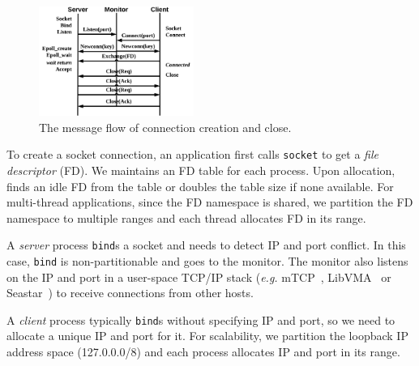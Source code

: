 \begin{figure}[t]
	\centering
	\includegraphics[width=0.45\textwidth]{images/conn-setup}
	\caption{The message flow of connection creation and close.}
	\label{fig:conn-setup}
	\vspace{-15pt}
\end{figure}

To create a socket connection, an application first calls \texttt{socket} to get a \textit{file descriptor} (FD). 
We maintains an FD table for each process. Upon allocation, \libipc{} finds an idle FD from the table or doubles the table size if none available. 
For multi-thread applications, since the FD namespace is shared, we partition the FD namespace to multiple ranges and each thread allocates FD in its range.

A \emph{server} process \texttt{bind}s a socket and needs to detect IP and port conflict. In this case, \texttt{bind} is non-partitionable and goes to the monitor. The monitor also listens on the IP and port in a user-space TCP/IP stack (\textit{e.g.} mTCP~\cite{jeong2014mtcp}, LibVMA~\cite{libvma} or Seastar~\cite{seastar}) to receive connections from other hosts.

A \emph{client} process typically \texttt{bind}s without specifying IP and port, so we need to allocate a unique IP and port for it. For scalability, we partition the loopback IP address space (127.0.0.0/8) and each process allocates IP and port in its range.


